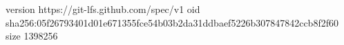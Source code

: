 version https://git-lfs.github.com/spec/v1
oid sha256:05f26793401d01e671355fce54b03b2da31ddbaef5226b307847842ccb8f2f60
size 1398256
